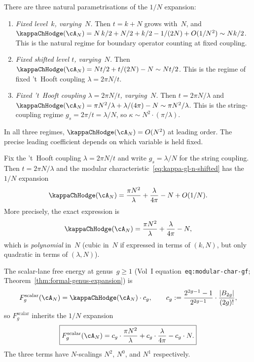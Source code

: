\begin{remark}
\label{rem:three-variables}
There are three natural parametrisations of the $1/N$ expansion:
\begin{enumerate}[label=\textup{(\roman*)}]
\item \emph{Fixed level~$k$, varying~$N$.} Then $t = k + N$ grows
 with~$N$, and $\kappaChHodge(\cA_N) = N\,k/2 + N/2 + k/2 - 1/(2N) + O(1/N^2)
 \sim Nk/2$. This is the natural regime for boundary operator
 counting at fixed coupling.
\item \emph{Fixed shifted level $t$, varying~$N$.} Then
 $\kappaChHodge(\cA_N) = Nt/2 + t/(2N) - N \sim Nt/2$.
 This is the regime of fixed 't~Hooft coupling
 $\lambda = 2\pi N/t$.
\item \emph{Fixed 't~Hooft coupling $\lambda = 2\pi N/t$,
 varying~$N$.} Then $t = 2\pi N/\lambda$ and
 $\kappaChHodge(\cA_N) = \pi N^2/\lambda + \lambda/(4\pi) - N
 \sim \pi N^2/\lambda$. This is the string-coupling regime
 $g_s = 2\pi/t = \lambda/N$, so $\kappa \sim N^2 \cdot (\pi/\lambda)$.
\end{enumerate}
In all three regimes, $\kappaChHodge(\cA_N) = O(N^2)$ at leading order. The
precise leading coefficient depends on which variable is held fixed.
\end{remark}

\begin{computation}
\label{comp:1overN-free-energies}
Fix the 't~Hooft coupling $\lambda = 2\pi N/t$ and write
$g_s = \lambda/N$ for the string coupling. Then $t = 2\pi N/\lambda$
and the modular characteristic~\eqref{eq:kappa-gl-n-shifted}
has the $1/N$ expansion
\begin{equation}\label{eq:kappa-1overN}
\kappaChHodge(\cA_N)
= \frac{\pi N^2}{\lambda}
+ \frac{\lambda}{4\pi}
- N
+ O(1/N).
\end{equation}
More precisely, the exact expression is
\begin{equation}\label{eq:kappa-exact-thooft}
\kappaChHodge(\cA_N) =
\frac{\pi N^2}{\lambda}
+ \frac{\lambda}{4\pi}
- N,
\end{equation}
which is \emph{polynomial} in~$N$ (cubic in~$N$ if expressed in terms of
$(k,N)$, but only quadratic in terms of $(\lambda,N)$).

The scalar-lane free energy at genus~$g \geq 1$
(Vol~I equation~\texttt{eq:modular-char-gf};
Theorem~\ref{thm:formal-genus-expansion}) is
\begin{equation}\label{eq:Fg-scalar-lane}
F_g^{\mathrm{scalar}}(\cA_N)
= \kappaChHodge(\cA_N) \cdot c_g,
\qquad
c_g := \frac{2^{2g-1}-1}{2^{2g-1}} \cdot \frac{|B_{2g}|}{(2g)!},
\end{equation}
so $F_g^{\mathrm{scalar}}$ inherits the $1/N$ expansion
\begin{equation}\label{eq:Fg-1overN}
\boxed{
F_g^{\mathrm{scalar}}(\cA_N)
= c_g \cdot \frac{\pi N^2}{\lambda}
+ c_g \cdot \frac{\lambda}{4\pi}
- c_g \cdot N.
}
\end{equation}
The three terms have $N$-scalings $N^2$, $N^0$, and $N^1$ respectively.
\end{computation}

